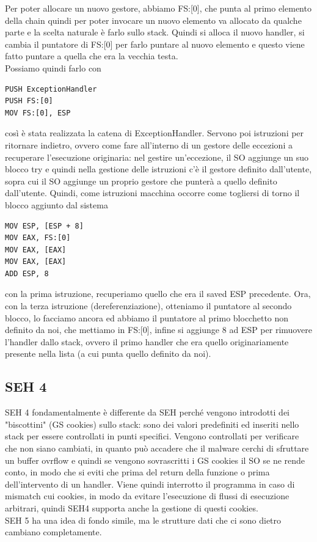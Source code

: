 \documentclass[12pt, oneside]{extbook}
\begin{document}
Per poter allocare un nuovo gestore, abbiamo FS:[0], che punta al primo elemento della chain quindi per poter invocare un nuovo elemento va allocato da qualche parte e la scelta naturale è farlo sullo stack. Quindi si alloca il nuovo handler, si cambia il puntatore di FS:[0] per farlo puntare al nuovo elemento e questo viene fatto puntare a quella che era la vecchia testa.\\Possiamo quindi farlo con 
\begin{lstlisting}
PUSH ExceptionHandler
PUSH FS:[0]
MOV FS:[0], ESP
\end{lstlisting}
così è stata realizzata la catena di ExceptionHandler. Servono poi istruzioni per ritornare indietro, ovvero come fare all'interno di un gestore delle eccezioni a recuperare l'esecuzione originaria: nel gestire un'eccezione, il SO aggiunge un suo blocco try e quindi nella gestione delle istruzioni c'è il gestore definito dall'utente, sopra cui il SO aggiunge un proprio gestore che punterà a quello definito dall'utente. Quindi, come istruzioni macchina occorre come togliersi di torno il blocco aggiunto dal sistema
\begin{lstlisting}
MOV ESP, [ESP + 8]
MOV EAX, FS:[0]
MOV EAX, [EAX]
MOV EAX, [EAX]
ADD ESP, 8
\end{lstlisting}
con la prima istruzione, recuperiamo quello che era il saved ESP precedente. Ora, con la terza istruzione (dereferenziazione), otteniamo il puntatore al secondo blocco, lo facciamo ancora ed abbiamo il puntatore al primo blocchetto non definito da noi, che mettiamo in FS:[0], infine si aggiunge 8 ad ESP per rimuovere l'handler dallo stack, ovvero il primo handler che era quello originariamente presente nella lista (a cui punta quello definito da noi).
\subsection{SEH 4}
SEH 4 fondamentalmente è differente da SEH perché vengono introdotti dei "biscottini" (GS cookies) sullo stack: sono dei valori predefiniti ed inseriti nello stack per essere controllati in punti specifici. Vengono controllati per verificare che non siano cambiati, in quanto può accadere che il malware cerchi di sfruttare un buffer ovrflow e quindi se vengono sovrascritti i GS cookies il SO se ne rende conto, in modo che si eviti che prima del return della funzione o prima dell'intervento di un handler. Viene quindi interrotto il programma in caso di mismatch cui cookies, in modo da evitare l'esecuzione di flussi di esecuzione arbitrari, quindi SEH4 supporta anche la gestione di questi cookies.\\SEH 5 ha una idea di fondo simile, ma le strutture dati che ci sono dietro cambiano completamente.
\end{document}
